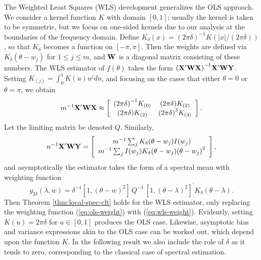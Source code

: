 \documentclass[12p E.Lt,psfig]{article} %
\begin{document}
 The Weighted Least Squares (WLS) development generalizes the OLS approach.   We consider a kernel function $K$
 with domain $[0,1]$; usually the kernel is taken to be symmetric, but we focus on one-sided kernels due to our
 analysis at the boundaries of the frequency domain.   Define
   $K_{\delta} (x) = {(2 \pi \delta)}^{-1} K (|x|/ (2 \pi \delta))$, so that
  $K_{\delta}$ becomes a function on $[-\pi, \pi]$.  Then the weights are defined via
   $K_{\delta} ( \theta - w_j)$ for $1 \leq j \leq m$,
  and $ {\bf W}$ is a diagonal matrix consisting of these numbers.  The WLS estimator of $f(\theta)$ takes the
   form $ {( {\bf X}^{\prime} {\bf W} {\bf X} )}^{-1} {\bf X}^{\prime} {\bf W} {\bf Y}$.
   Setting   $K_{(j)} = \int_0^1 K (  u) u^j du$, and focusing on the cases that either $\theta = 0$ or $\theta = \pi$,
      we obtain
\[
 m^{-1}  {\bf X}^{\prime} {\bf W} {\bf X}   \approx
     \left[ \begin{array}{cc}   {(2 \pi \delta)}^{-1} K_{(0)} &   {(2 \pi \delta)} K_{(2)} \\
 	  {(2 \pi \delta)}  K_{(2)} &   {(2 \pi \delta)}^{3} K_{(4)}  \end{array} \right].
\]
  Let the limiting matrix be denoted $Q$.
   Similarly,
\[
    n^{-1} {\bf X}^{\prime} {\bf W}  {\bf Y} =
    \left[ \begin{array}{c}  m^{-1} \sum_j  K_{\delta} (\theta - w_j)  I (w_j)  \\  m^{-1} \sum_j  I(w_j)
     K_{\delta} (\theta - w_j)  {(\theta -w_j)}^2 \end{array} \right],
\]
 and  asymptotically the estimator takes the form of a spectral mean with weighting function
\begin{equation}
\label{eq:wls-weight}
  g_{2 \delta} ( \lambda, w) =  \delta^{-1}  [ 1,  {( \theta  - w)}^2 ] \, Q^{-1}  \,
    { [ 1,  {(\theta   - \lambda )}^2  ]}^{\prime}       K_{\delta} (\theta- \lambda).
 \end{equation}
  Then Theorem \ref{thm:local-spec-clt} holds for the WLS estimator, only replacing the weighting function
  (\ref{eq:ols-weight}) with (\ref{eq:wls-weight}).
   Evidently, setting $K(u) = 2 \pi \delta $ for $u \in [0,1]$ produces the OLS case.
   Likewise,  asymptotic bias and variance expressions akin to the OLS case can be worked out,
  which depend upon the function $K$.  In the following result we also include the role of $\delta$ as it tends to zero,
  corresponding to the classical case of spectral estimation. 
\end{document}
